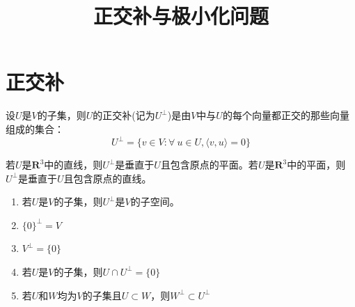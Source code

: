 \documentclass[10pt,a4paper,UTF8]{article}
\date{}
\title{正交补与极小化问题}
\begin{document}
\maketitle
\tableofcontents
{}

\section{正交补}
\label{sec:org0110aba}


\begin{definition}
设\(U\)是\(V\)的子集，则\(U\)的正交补(记为\(U^{\perp}\))是由\(V\)中与\(U\)的每个向量都正交的那些向量组成的集合：
\begin{equation}
\label{eq:1}
U^{\perp} = \{v\in V: \forall~u\in U, \langle v,u \rangle = 0  \}
\end{equation}
\end{definition}

若\(U\)是\(\mathbf{R}^{3}\)中的直线，则\(U^{\perp}\)是垂直于\(U\)且包含原点的平面。若\(U\)是\(\mathbf{R}^{3}\)中的平面，则\(U^{\perp}\)是垂直于\(U\)且包含原点的直线。

\begin{theorem}
\begin{enumerate}
\item 若\(U\)是\(V\)的子集，则\(U^{\perp}\)是\(V\)的子空间。
\item \(\{0\}^{\perp} = V\)
\item \(V^{\perp} = \{0\}\)
\item 若\(U\)是\(V\)的子集，则\(U\cap U^{\perp} = \{0\}\)
\item 若\(U\)和\(W\)均为\(V\)的子集且\(U\subset W\)，则\(W^{\perp} \subset U^{\perp}\)
\end{enumerate}
\end{theorem}
\end{document}
